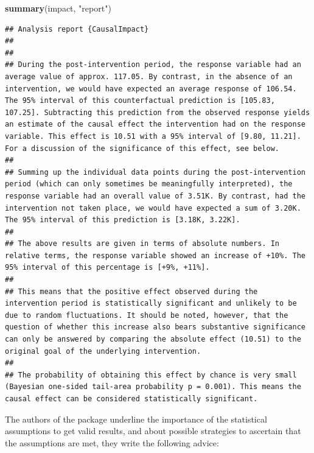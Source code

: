 \documentclass[
]{article}
\newenvironment{Shaded}{\begin{snugshade}}{\end{snugshade}}
\newcommand{\KeywordTok}[1]{\textcolor[rgb]{0.13,0.29,0.53}{\textbf{#1}}}
\newcommand{\NormalTok}[1]{#1}
\newcommand{\StringTok}[1]{\textcolor[rgb]{0.31,0.60,0.02}{#1}}
\begin{document}
\begin{Shaded}
\begin{Highlighting}[]
\KeywordTok{summary}\NormalTok{(impact, }\StringTok{"report"}\NormalTok{)}
\end{Highlighting}
\end{Shaded}

\begin{verbatim}
## Analysis report {CausalImpact}
## 
## 
## During the post-intervention period, the response variable had an average value of approx. 117.05. By contrast, in the absence of an intervention, we would have expected an average response of 106.54. The 95% interval of this counterfactual prediction is [105.83, 107.25]. Subtracting this prediction from the observed response yields an estimate of the causal effect the intervention had on the response variable. This effect is 10.51 with a 95% interval of [9.80, 11.21]. For a discussion of the significance of this effect, see below.
## 
## Summing up the individual data points during the post-intervention period (which can only sometimes be meaningfully interpreted), the response variable had an overall value of 3.51K. By contrast, had the intervention not taken place, we would have expected a sum of 3.20K. The 95% interval of this prediction is [3.18K, 3.22K].
## 
## The above results are given in terms of absolute numbers. In relative terms, the response variable showed an increase of +10%. The 95% interval of this percentage is [+9%, +11%].
## 
## This means that the positive effect observed during the intervention period is statistically significant and unlikely to be due to random fluctuations. It should be noted, however, that the question of whether this increase also bears substantive significance can only be answered by comparing the absolute effect (10.51) to the original goal of the underlying intervention.
## 
## The probability of obtaining this effect by chance is very small (Bayesian one-sided tail-area probability p = 0.001). This means the causal effect can be considered statistically significant.
\end{verbatim}

The authors of the package underline the importance of the statistical assumptions to get valid results, and about possible strategies to ascertain that the assumptions are met, they write the following advice:
\end{document}
